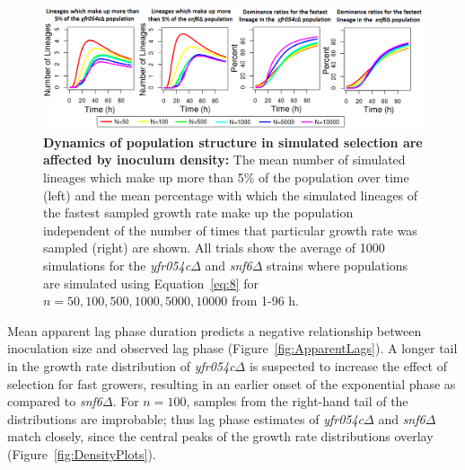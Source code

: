 \documentclass{bioinfo}
\begin{document}
\setcounter{figure}{8}
\begin{figure}[hb!]
\vspace{-1em}
\centering
\includegraphics[width=0.9\linewidth]{Ch2Percentages.png}
\vspace{-1em}
\caption{\footnotesize{\textbf{Dynamics of population structure in simulated selection are affected by inoculum density:} The mean number of simulated lineages which make up more than 5\% of the population over time (left) and the mean percentage with which the simulated lineages of the fastest sampled growth rate make up the population independent of the number of times that particular growth rate was sampled (right) are shown. All trials show the average of 1000 simulations for the \textit{yfr054c}$\Delta$ and \textit{snf6}$\Delta$ strains where populations are simulated using Equation~\ref{eq:8} for $n=50,100,500,1000,5000,10000$ from 1-96 h.}}
\label{fig:Percentages}
\vspace{-3em}
\end{figure}

Mean apparent lag phase duration predicts a negative relationship between inoculation size and observed lag phase (Figure~\ref{fig:ApparentLags}). A longer tail in the growth rate distribution of \textit{yfr054c}$\Delta$ is suspected to increase the effect of selection for fast growers, resulting in an earlier onset of the exponential phase as compared to \textit{snf6}$\Delta$. For $n=100$, samples from the right-hand tail of the distributions are improbable; thus lag phase estimates of \textit{yfr054c}$\Delta$ and \textit{snf6}$\Delta$ match closely, since the central peaks of the growth rate distributions overlay (Figure~\ref{fig:DensityPlots}). 
\end{document}
